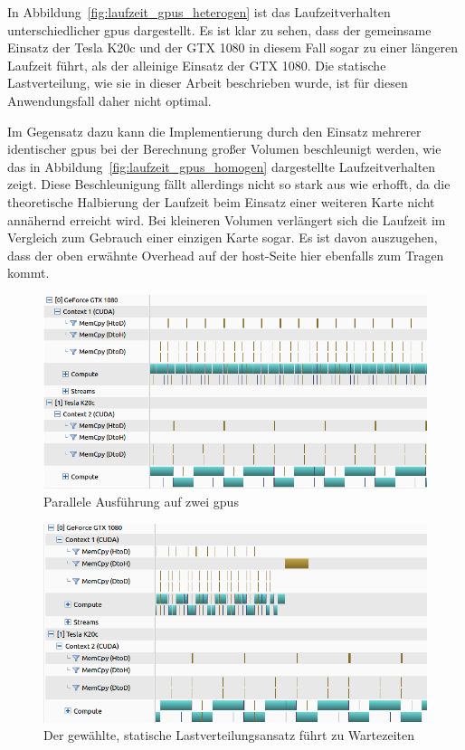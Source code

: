 In Abbildung~\ref{fig:laufzeit_gpus_heterogen} ist das Laufzeitverhalten unterschiedlicher \gls{gpu}s dargestellt. Es
ist klar zu sehen, dass der gemeinsame Einsatz der Tesla K20c und der GTX 1080 in diesem Fall sogar zu einer längeren
Laufzeit führt, als der alleinige Einsatz der GTX 1080. Die statische Lastverteilung, wie sie in dieser Arbeit
beschrieben wurde, ist für diesen Anwendungsfall daher nicht optimal. 

Im Gegensatz dazu kann die Implementierung durch den Einsatz mehrerer identischer \gls{gpu}s bei der Berechnung großer
Volumen beschleunigt werden, wie das in Abbildung~\ref{fig:laufzeit_gpus_homogen} dargestellte Laufzeitverhalten zeigt.
Diese Beschleunigung fällt allerdings nicht so stark aus wie erhofft, da die theoretische Halbierung der Laufzeit beim
Einsatz einer weiteren Karte nicht annähernd erreicht wird. Bei kleineren Volumen verlängert sich die Laufzeit im
Vergleich zum Gebrauch einer einzigen Karte sogar. Es ist davon auszugehen, dass der oben erwähnte Overhead auf der
\gls{host}-Seite hier ebenfalls zum Tragen kommt.

\begin{figure}
    \includegraphics[width=\linewidth]{img/timeline_multi_compute}
    \caption{Parallele Ausführung auf zwei \gls{gpu}s}
    \label{fig:kernel_multi_compute}
\end{figure}

\begin{figure}
    \includegraphics[width=\linewidth]{img/timeline_multi_bad}
    \caption{Der gewählte, statische Lastverteilungsansatz führt zu Wartezeiten}
    \label{fig:kernel_multi_bad}
\end{figure}

